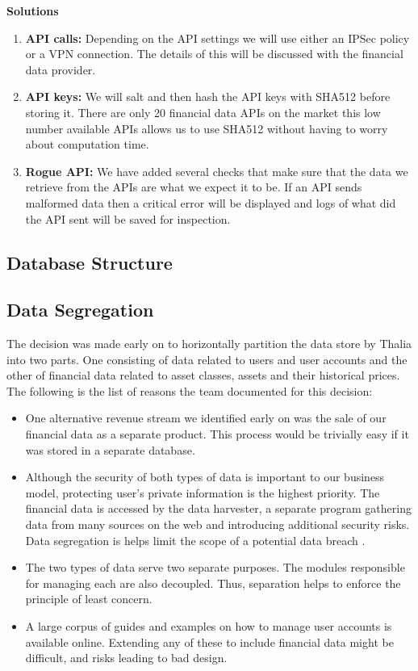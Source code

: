 \documentclass[main.tex]{subfiles}
\begin{document}
\textbf{Solutions}
\begin{enumerate}
    \item \textbf{API calls:} Depending on the API settings we will use either an IPSec policy or a VPN connection. The details of this will be discussed with the financial data provider.
    \item \textbf{API keys:} We will salt and then hash the API keys with SHA512 before storing it. There are only 20 financial data APIs on the market this low number available APIs allows us to use SHA512 without having to worry about computation time. 
    \item \textbf{Rogue API:} We have added several checks that make sure that the data we retrieve from the APIs are what we expect it to be. If an API sends malformed data then a critical error will be displayed and logs of what did the API sent will be saved for inspection. 
\end{enumerate}



\subsection{Database Structure}
\label{DB Structure}

\subsection{Data Segregation}

The decision was made early on to horizontally partition the data store by Thalia into two parts. One consisting of data related to users and user accounts and the other of financial data related to asset classes, assets and their historical prices. The following is the list of reasons the team documented for this decision:

\begin{itemize}

\item One alternative revenue stream we identified early on was the sale of our financial data as a separate product. This process would be trivially easy if it was stored in a separate database. 
\item Although the security of both types of data is important to our business model, protecting user’s private information is the highest priority. The financial data is accessed by the data harvester, a separate program gathering data from many sources on the web and introducing additional security risks. Data segregation is helps limit the scope of a potential data breach \cite{ciscoSeg}.
\item The two types of data serve two separate purposes. The modules responsible for managing each are also decoupled. Thus, separation helps to enforce the principle of least concern.
\item A large corpus of guides and examples on how to manage user accounts is available online. Extending any of these to include financial data might be difficult, and risks leading to bad design.
\end{itemize}
\end{document}
